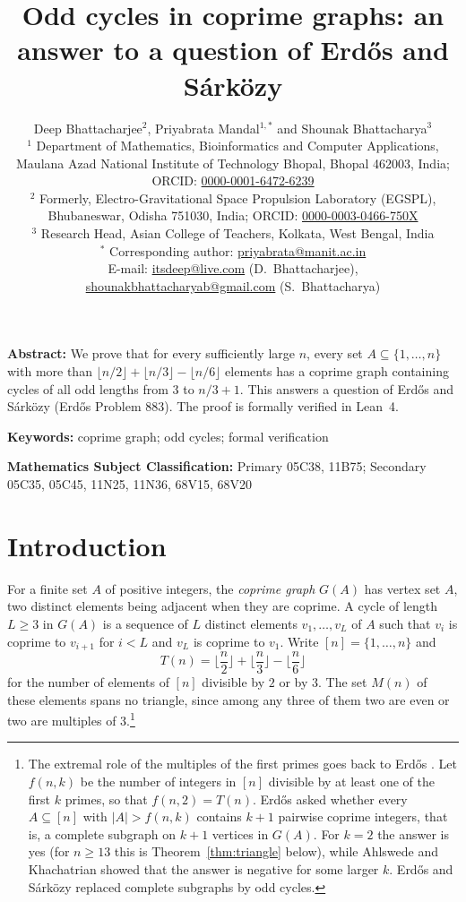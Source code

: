 \documentclass[11pt,a4paper]{article}
\title{\bfseries Odd cycles in coprime graphs: an answer to a question of Erd\H{o}s and S\'ark\"ozy}
\author{Deep Bhattacharjee$^{2}$, Priyabrata Mandal$^{1,*}$ and Shounak Bhattacharya$^{3}$\\[2mm]
{\small $^{1}$ Department of Mathematics, Bioinformatics and Computer Applications,}\\
{\small Maulana Azad National Institute of Technology Bhopal, Bhopal 462003, India;}\\
{\small ORCID: \href{https://orcid.org/0000-0001-6472-6239}{0000-0001-6472-6239}}\\
{\small $^{2}$ Formerly, Electro-Gravitational Space Propulsion Laboratory (EGSPL),}\\
{\small Bhubaneswar, Odisha 751030, India; ORCID:
\href{https://orcid.org/0000-0003-0466-750X}{0000-0003-0466-750X}}\\
{\small $^{3}$ Research Head, Asian College of Teachers, Kolkata, West Bengal, India}\\[2mm]
{\small $^{*}$ Corresponding author: \href{mailto:priyabrata@manit.ac.in}{priyabrata@manit.ac.in}}\\
{\small E-mail: \href{mailto:itsdeep@live.com}{itsdeep@live.com} (D.~Bhattacharjee),}\\
{\small \href{mailto:shounakbhattacharyab@gmail.com}{shounakbhattacharyab@gmail.com} (S.~Bhattacharya)}}
\date{}
\theoremstyle{definition}
\theoremstyle{remark}
\begin{document}
\maketitle
\thispagestyle{empty}

\noindent\textbf{Abstract:} We prove that for every sufficiently large $n$, every set
$A\subseteq\{1,\dots,n\}$ with more than $\lfloor n/2\rfloor+\lfloor n/3\rfloor-\lfloor n/6\rfloor$
elements has a coprime graph containing cycles of all odd lengths from $3$ to $n/3+1$. This answers
a question of Erd\H{o}s and S\'ark\"ozy (Erd\H{o}s Problem 883). The proof is formally verified in
Lean~4.

\medskip
\noindent\textbf{Keywords:} coprime graph; odd cycles; formal verification

\smallskip
\noindent\textbf{Mathematics Subject Classification:} Primary 05C38, 11B75; Secondary 05C35,
05C45, 11N25, 11N36, 68V15, 68V20

{\small
\setcounter{tocdepth}{1}
\renewcommand{\contentsname}{\normalsize Contents}
\tableofcontents}

\section{Introduction}\label{sec:intro}

For a finite set $A$ of positive integers, the \emph{coprime graph} $G(A)$ has vertex set $A$, two
distinct elements being adjacent when they are coprime. A cycle of length $L\ge 3$ in $G(A)$ is a
sequence of $L$ distinct elements $v_1,\dots,v_L$ of $A$ such that $v_i$ is coprime to $v_{i+1}$ for
$i<L$ and $v_L$ is coprime to $v_1$. Write $[n]=\{1,\dots,n\}$ and
\[
  T(n)=\Big\lfloor\frac n2\Big\rfloor+\Big\lfloor\frac n3\Big\rfloor-\Big\lfloor\frac n6\Big\rfloor
\]
for the number of elements of $[n]$ divisible by $2$ or by $3$. The set $M(n)$ of these elements
spans no triangle, since among any three of them two are even or two are multiples of
$3$.\footnote{The extremal role of the multiples of the first primes goes back to Erd\H{o}s
\cite{Erdos62}. Let $f(n,k)$ be the number of integers in $[n]$ divisible by at least one of the first
$k$ primes, so that $f(n,2)=T(n)$. Erd\H{o}s asked whether every $A\subseteq[n]$ with $|A|>f(n,k)$
contains $k+1$ pairwise coprime integers, that is, a complete subgraph on $k+1$ vertices in $G(A)$.
For $k=2$ the answer is yes (for $n\ge13$ this is Theorem~\ref{thm:triangle} below), while Ahlswede
and Khachatrian \cite{AK94} showed that the answer is negative for some larger $k$. Erd\H{o}s and
S\'ark\"ozy \cite{ES97} replaced complete subgraphs by odd cycles.}
\end{document}
